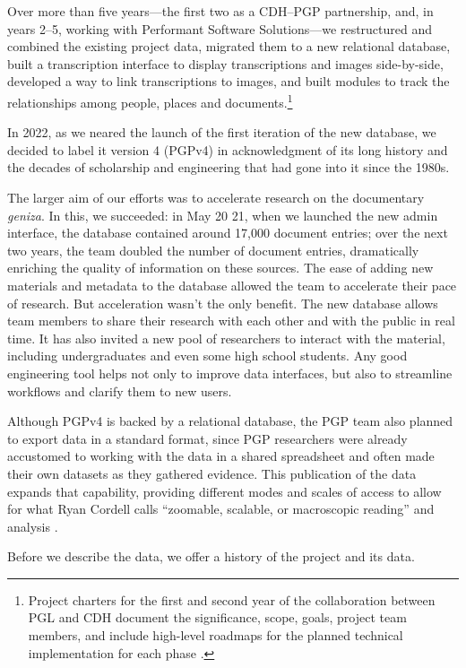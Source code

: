 \documentclass{article}
\begin{document}
Over more than five years—the first two as a CDH–PGP partnership, and, in years 2–5, working with Performant Software Solutions—we restructured and combined the existing project data, migrated them to a new relational database, built a transcription interface to display transcriptions and images side-by-side, developed a way to link transcriptions to images, and built modules to track the relationships among people, places and documents.\footnote{Project charters for the first and second year of the collaboration between PGL and CDH document the significance, scope, goals, project team members, and include high-level roadmaps for the planned technical implementation for each phase \autocite{budak_cdh_2020, rustow_cdh_2022}. } 

In 2022, as we neared the launch of the first iteration of the new database, we decided to label it version 4 (PGPv4) in acknowledgment of its long history and the decades of scholarship and engineering that had gone into it since the 1980s.

The larger aim of our efforts was to accelerate research on the documentary \textit{geniza}. In this, we succeeded: in May 20 21, when we launched the new admin interface, the database contained around 17,000 document entries; over the next two years, the team doubled the number of document entries, dramatically enriching the quality of information on these sources. The ease of adding new materials and metadata to the database allowed the team to accelerate their pace of research. But acceleration wasn't the only benefit. The new database allows team members to share their research with each other and with the public in real time. It has also invited a new pool of researchers to interact with the material, including undergraduates and even some high school students. Any good engineering tool helps not only to improve data interfaces, but also to streamline workflows and clarify them to new users.  

Although PGPv4 is backed by a relational database, the PGP team also planned to export data in a standard format, since PGP researchers were already accustomed to working with the data in a shared spreadsheet and often made their own datasets as they gathered evidence. This publication of the data expands that capability, providing different modes and scales of access to allow for what Ryan Cordell calls “zoomable, scalable, or macroscopic reading” and analysis \autocite{cordell_what_2017}. 

Before we describe the data, we offer a history of the project and its data.
\end{document}
